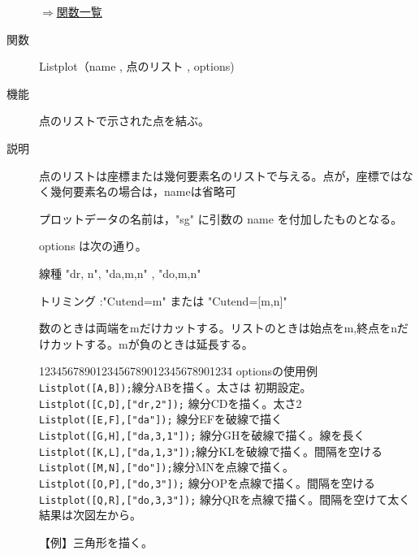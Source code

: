 \documentclass[papersize,a4paper,12pt,uplatex]{jsarticle}
\begin{document}
\begin{description}
\vspace{\baselineskip}
\hspace{20mm} 

\begin{flushright}\hyperlink{functionlist}{$\Rightarrow$関数一覧}\end{flushright}

\vspace{\baselineskip}
\hypertarget{listplot}{}
\item[関数]Listplot（name , 点のリスト , options)
\item[機能]点のリストで示された点を結ぶ。
\item[説明]点のリストは座標または幾何要素名のリストで与える。点が，座標ではなく幾何要素名の場合は，nameは省略可 

プロットデータの名前は，"sg" に引数の name を付加したものとなる。

 options は次の通り。

線種 "dr, n", "da,m,n" , "do,m,n"

トリミング :"Cutend=m" または "Cutend=[m,n]" 

数のときは両端をmだけカットする。リストのときは始点をm,終点をnだけカットする。mが負のときは延長する。

\begin{tabbing}
1234567890123456789012345678901234\=\kill
optionsの使用例\\
\verb|Listplot([A,B]);|\>線分ABを描く。太さは 初期設定。\\
\verb|Listplot([C,D],["dr,2"]);| \>線分CDを描く。太さ2\\
\verb|Listplot([E,F],["da"]);| \>線分EFを破線で描く\\
\verb|Listplot([G,H],["da,3,1"]);| \>線分GHを破線で描く。線を長く\\
\verb|Listplot([K,L],["da,1,3"]);|\>線分KLを破線で描く。間隔を空ける\\
\verb|Listplot([M,N],["do"]);|\>線分MNを点線で描く。\\
\verb|Listplot([O,P],["do,3"]);| \>線分OPを点線で描く。間隔を空ける\\
\verb|Listplot([Q,R],["do,3,3"]);| \>線分QRを点線で描く。間隔を空けて太く\\
結果は次図左から。
\end{tabbing}
\begin{center} \scalebox{0.9}{}\end{center}

【例】三角形を描く。


\end{description}
\end{document}
